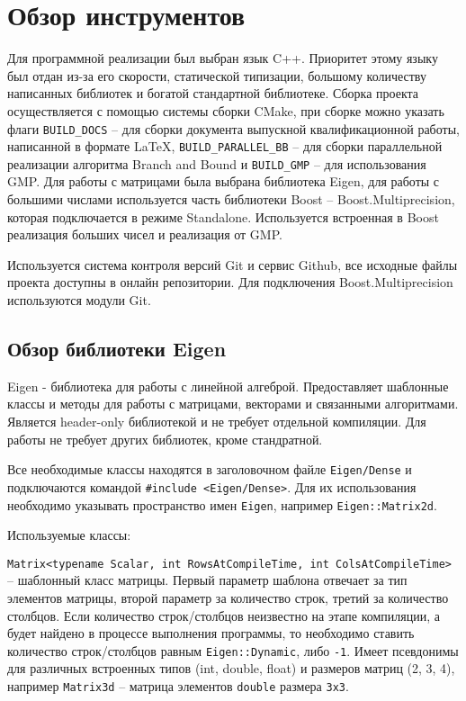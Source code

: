 \newpage

\section{Обзор инструментов}

Для программной реализации был выбран язык C++. Приоритет этому языку был отдан из-за его скорости, статической типизации, большому количеству написанных библиотек и богатой стандартной библиотеке. Сборка проекта осуществляется с помощью системы сборки CMake, при сборке можно указать флаги \verb!BUILD_DOCS! -- для сборки документа выпускной квалификационной работы, написанной в формате \LaTeX, \verb!BUILD_PARALLEL_BB! -- для сборки параллельной реализации алгоритма Branch and Bound и \verb!BUILD_GMP! -- для использования GMP. Для работы с матрицами была выбрана библиотека Eigen, для работы с большими числами используется часть библиотеки Boost -- Boost.Multiprecision, которая подключается в режиме Standalone. Используется встроенная в Boost реализация больших чисел и реализация от GMP.

Используется система контроля версий Git и сервис Github, все исходные файлы проекта доступны в онлайн репозитории. Для подключения Boost.Multiprecision используются модули Git.

\subsection{Обзор библиотеки Eigen}

Eigen - библиотека для работы с линейной алгеброй. Предоставляет шаблонные классы и методы для работы с матрицами, векторами и связанными алгоритмами. Является header-only библиотекой и не требует отдельной компиляции. Для работы не требует других библиотек, кроме стандратной.

Все необходимые классы находятся в заголовочном файле \verb!Eigen/Dense! и подключаются командой \verb!#include <Eigen/Dense>!. Для их использования необходимо указывать пространство имен \verb!Eigen!, например \verb!Eigen::Matrix2d!.

Используемые классы:

\verb!Matrix<typename Scalar, int RowsAtCompileTime, int ColsAtCompileTime>! -- шаблонный класс матрицы. Первый параметр шаблона отвечает за тип элементов матрицы, второй параметр за количество строк, третий за количество столбцов. Если количество строк/столбцов неизвестно на этапе компиляции, а будет найдено в процессе выполнения программы, то необходимо ставить количество строк/столбцов равным \verb!Eigen::Dynamic!, либо \verb!-1!. Имеет псевдонимы для различных встроенных типов (int, double, float) и размеров матриц (2, 3, 4), например \verb!Matrix3d! -- матрица элементов \verb!double! размера \verb!3x3!. 

